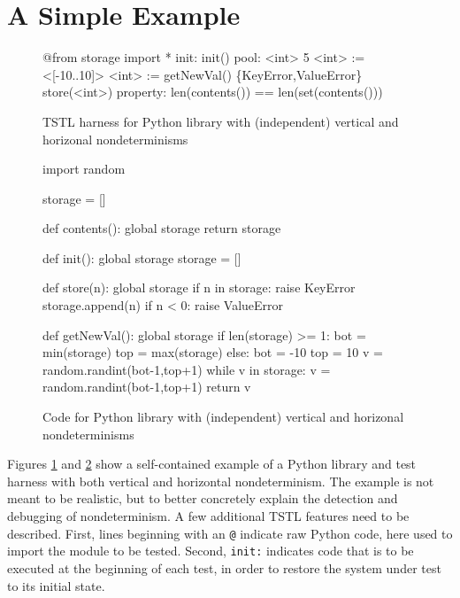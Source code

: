 \section{A Simple Example}

\begin{figure}
{\scriptsize
\begin{code}
@from storage import *
\vspace{0.1in}
init: init()
\vspace{0.1in}
pool: <int> 5
\vspace{0.1in}
<int> := <[-10..10]>
<int> := getNewVal()
\{KeyError,ValueError\} store(<int>)
\vspace{0.1in}
property: len(contents()) == len(set(contents()))
\end{code}
}
\caption{TSTL harness for Python library with (independent) vertical and
  horizonal nondeterminisms}
\label{fig:simpleexample}
\end{figure}

\begin{figure}
\begin{code}
import random

storage = []

def contents():
    global storage
    return storage

def init():
    global storage
    storage = []

def store(n):
    global storage
    if n in storage:
       raise KeyError
    storage.append(n)
    if n < 0:
       raise ValueError

def getNewVal():
    global storage
    if len(storage) >= 1:
        bot = min(storage)
        top = max(storage)
    else:
        bot = -10
        top = 10
    v = random.randint(bot-1,top+1)
    while v in storage:
        v = random.randint(bot-1,top+1)
    return v
\end{code}
\caption{Code for Python library with (independent) vertical and
  horizonal nondeterminisms}
\label{fig:simpleexamplecode}
\end{figure}

Figures \ref{fig:simpleexample} and \ref{fig:simpleexamplecode} show a self-contained example of a
Python library and test harness with both vertical and horizontal
nondeterminism.  The example is not meant to be realistic, but to
better concretely explain the detection and debugging of
nondeterminism.  A few additional TSTL features need to be described.
First, lines beginning with an {\tt @} indicate raw Python code, here
used to import the module to be tested.  Second, {\tt init:} indicates
code that is to be executed at the beginning of each test, in
order to restore the system under test to its initial state.


